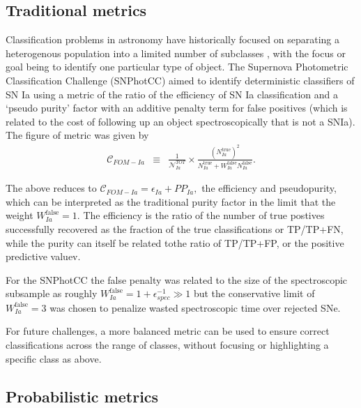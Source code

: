 \subsection{Traditional metrics}
\label{sec:past}

Classification problems in astronomy have historically focused on separating a heterogenous population into a limited number of subclasses \cite{kessler_results_2010}, with the focus or goal being to identify one particular type of object.
The Supernova Photometric Classification Challenge (SNPhotCC) aimed to identify deterministic classifiers of SN Ia using a metric of the ratio of the efficiency of SN Ia classification and a `pseudo purity' factor with an additive penalty term for false positives (which is related to the cost of following up an object spectroscopically that is not a SNIa).
The figure of metric was given by
\begin{eqnarray}
  \label{eq:snphotcc}
  \mathcal{C}_{FOM-Ia} &\equiv& \frac{1}{\mathcal{N}_{Ia}^{TOT}}\times \frac{(N_{Ia}^{\mathrm{true}})^2}{N_{Ia}^\mathrm{true}+W_{Ia}^\mathrm{false}N_{Ia}^\mathrm{false}}.
\end{eqnarray}

The above reduces to $\mathcal{C}_{FOM-Ia}  = \epsilon_{Ia} + PP_{Ia},$ the efficiency and pseudopurity, which can be interpreted as the traditional purity factor in the limit that the weight $W_{Ia}^\mathrm{false} = 1$.
The efficiency is the ratio of the number of true postives successfully recovered as the fraction of the true classifications or TP/TP+FN, while the purity can itself be related tothe ratio of TP/TP+FP, or the positive predictive valuev.

For the SNPhotCC the false penalty was related to the size of the spectroscopic subsample as roughly $W_{Ia}^\mathrm{false} = 1 + \epsilon_{spec}^{-1} \gg 1$ but the conservative limit of $W_{Ia}^\mathrm{false} = 3$ was chosen to penalize wasted spectroscopic time over rejected SNe.

For future challenges, a more balanced metric can be used to ensure correct classifications across the range of classes, without focusing or highlighting a specific class as above.

\subsection{Probabilistic metrics}
\label{sec:metrics}

